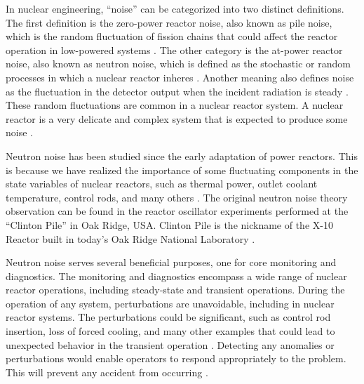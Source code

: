 \label{ch:literature_review}

In nuclear engineering, “noise” can be categorized into two distinct definitions. The first definition is the zero-power reactor noise, also known as pile noise, which is the random fluctuation of fission chains that could affect the reactor operation in low-powered systems \cite{pazsitNoiseTechniquesNuclear2010, pazsitNeutronFluctuationsTreatise2008, uhrigRandomNoiseTechniques1970}. The other category is the at-power reactor noise, also known as neutron noise, which is defined as the stochastic or random processes in which a nuclear reactor inheres \cite{saitoTheoryPowerReactor1974b}. Another meaning also defines noise as the fluctuation in the detector output when the incident radiation is steady \cite{pacilioAnalysisReactorNoise1979}. These random fluctuations are common in a nuclear reactor system. A nuclear reactor is a very delicate and complex system that is expected to produce some noise \cite{thiePowerReactorNoise1981}.

Neutron noise has been studied since the early adaptation of power reactors. This is because we have realized the importance of some fluctuating components in the state variables of nuclear reactors, such as thermal power, outlet coolant temperature, control rods, and many others \cite{saitoTheoryPowerReactor1974, saitoTheoryPowerReactor1974a}. The original neutron noise theory observation can be found in the reactor oscillator experiments performed at the “Clinton Pile” in Oak Ridge, USA. Clinton Pile is the nickname of the X-10 Reactor built in today's Oak Ridge National Laboratory \cite{pazsitNoiseTechniquesNuclear2010}. 

Neutron noise serves several beneficial purposes, one for core monitoring and diagnostics. The monitoring and diagnostics encompass a wide range of nuclear reactor operations, including steady-state and transient operations. During the operation of any system, perturbations are unavoidable, including in nuclear reactor systems. The perturbations could be significant, such as control rod insertion, loss of forced cooling, and many other examples that could lead to unexpected behavior in the transient operation \cite{ottIntroductoryNuclearReactor1985}. Detecting any anomalies or perturbations would enable operators to respond appropriately to the problem. This will prevent any accident from occurring \cite{ferrierReactorNoise1963}. 

